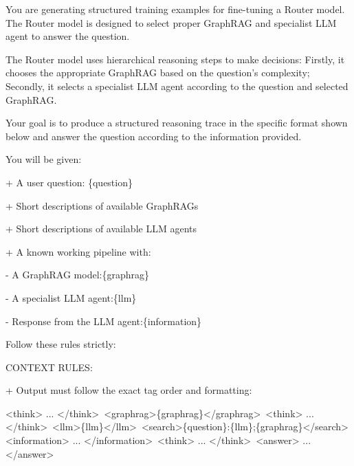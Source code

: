 \begin{tcolorbox}[
    mygreenbox,
    enhanced jigsaw,
    width=\textwidth,
    title={General Trace Generation Prompt},
    fonttitle=\Large\bfseries,
    before upper={
        \setlength{\parindent}{0pt}
        \setlength{\parskip}{0pt}
    }
]

You are generating structured training examples for fine-tuning a Router model. The Router model is designed to select proper GraphRAG and specialist LLM agent to answer the question.\par\noindent
The Router model uses hierarchical reasoning steps to make decisions: Firstly, it chooses the appropriate GraphRAG based on the question's complexity; Secondly, it selects a specialist LLM agent according to the question and selected GraphRAG.\par\noindent
Your goal is to produce a structured reasoning trace in the specific format shown below and answer the question according to the information provided.\par\noindent

\medskip
You will be given:\par\noindent
+ A user question: \{question\}\par\noindent
+ Short descriptions of available GraphRAGs\par\noindent
+ Short descriptions of available LLM agents\par\noindent
+ A known working pipeline with:\par\noindent
\quad - A GraphRAG model:\{graphrag\}\par\noindent
\quad - A specialist LLM agent:\{llm\}\par\noindent
\quad - Response from the LLM agent:\{information\}\par\noindent

\medskip
Follow these rules strictly:\par\noindent

\medskip
CONTEXT RULES:\par\noindent
+ Output must follow the exact tag order and formatting:\par

{\ttfamily\raggedright\noindent
<think> ... </think>\,\allowbreak
<graphrag>\{graphrag\}</graphrag>\,\allowbreak
<think> ... </think>\,\allowbreak
<llm>\{llm\}</llm>\,\allowbreak
<search>\{question\}:\{llm\};\{graphrag\}</search>\,\allowbreak
<information> ... </information>\,\allowbreak
<think> ... </think>\,\allowbreak
<answer> ... </answer>\par
}


\end{tcolorbox}
